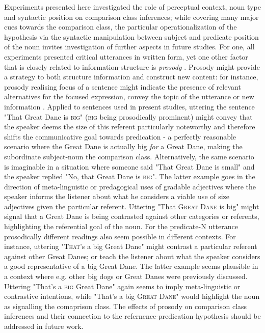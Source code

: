Experiments presented here investigated the role of perceptual context, noun type and syntactic position on comparison class inferences; while covering many major cues towards the comparison class, the particular operationalization of the hypothesis via the syntactic manipulation between subject and predicate position of the noun invites investigation of further aspects in future studies. For one, all experiments presented critical utterances in written form, yet one other factor that is closely related to information-structure is \emph{prosody} \parencite{krifka2008basic}. Prosody might provide a strategy to both structure information and construct new content: for instance, prosody realising focus of a sentence might indicate the presence of relevant alternatives for the focused expression, convey the topic of the utterance or new information \parencite{krifka2008basic, selkirk1995sentence}. 
Applied to sentences used in present studies, uttering the sentence "That Great Dane is \textsc{big}" (\textsc{big} being prosodically prominent) might convey that the speaker deems the size of this referent particularly noteworthy and therefore shifts the communicative goal towards predication - a perfectly reasonable scenario where the Great Dane is actually big \emph{for} a Great Dane, making the subordinate subject-noun the comparison class.  Alternatively, the same scenario is imaginable in a situation where someone said "That Great Dane is small" and the speaker replied "No, that Great Dane is \textsc{big}". The latter example goes in the direction of meta-linguistic or predagogical uses of gradable adjectives where the speaker informs the listener about what he considers a viable use of size adjectives given the particular referent. Uttering "That \textsc{Great Dane} is big" might signal that a Great Dane is being contrasted against other categories or referents, highlighting the referential goal of the noun.
For the predicate-N utterance prosodically different readings also seem possible in different contexts. For instance, uttering "\textsc{That}'s a big Great Dane" might contrast a particular referent against other Great Danes; or teach the listener about what the speaker considers a good representative of a big Great Dane. The latter example seems plausible in a context where e.g. other big dogs or Great Danes were previously discussed. Uttering "That's a \textsc{big} Great Dane" again seems to imply meta-linguistic or contrastive intentions, while "That's a big \textsc{Great Dane}" would highlight the noun as signalling the comaprison class. 
The effects of prosody on comparison class inferences and their connection to the refernence-predication hypothesis should be addressed in future work. 


